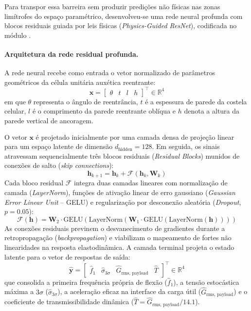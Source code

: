 Para transpor essa barreira sem produzir predições não físicas nas zonas limítrofes do espaço paramétrico, desenvolveu-se uma rede neural profunda com blocos residuais guiada por leis físicas (\textit{Physics-Guided ResNet}), codificada no módulo .

\paragraph*{Arquitetura da rede residual profunda.}
\label{par:arquitetura}
A rede neural recebe como entrada o vetor normalizado de parâmetros geométricos da célula unitária auxética reentrante:
\begin{equation}
  \mathbf{x} = \begin{bmatrix} \theta & t & l & h \end{bmatrix}^{\top} \in \mathbb{R}^{4}
  \label{eq:entrada}
\end{equation}
em que $\theta$ representa o ângulo de reentrância, $t$ é a espessura de parede da costela celular, $l$ é o comprimento da parede reentrante oblíqua e $h$ denota a altura da parede vertical de ancoragem.

O vetor $\mathbf{x}$ é projetado inicialmente por uma camada densa de projeção linear para um espaço latente de dimensão $d_{\text{hidden}} = 128$. Em seguida, os sinais atravessam sequencialmente três blocos residuais (\textit{Residual Blocks}) munidos de conexões de salto (\textit{skip connections}):
\begin{equation}
  \mathbf{h}_{k+1} = \mathbf{h}_k + \mathcal{F}(\mathbf{h}_k, \mathbf{W}_k)
  \label{eq:residual}
\end{equation}
Cada bloco residual $\mathcal{F}$ integra duas camadas lineares com normalização de camada (\textit{LayerNorm}), funções de ativação linear de erro gaussiano (\textit{Gaussian Error Linear Unit} -- GELU) e regularização por desconexão aleatória (\textit{Dropout}, $p = \num{0.05}$):
\begin{equation}
  \mathcal{F}(\mathbf{h}) = \mathbf{W}_2 \cdot \mathrm{GELU}\!\left( \mathrm{LayerNorm}\!\left( \mathbf{W}_1 \cdot \mathrm{GELU}\!\left( \mathrm{LayerNorm}(\mathbf{h}) \right) \right) \right)
  \label{eq:bloco}
\end{equation}
As conexões residuais previnem o desvanecimento de gradientes durante a retropropagação (\textit{backpropagation}) e viabilizam o mapeamento de fortes não linearidades na resposta elastodinâmica. A camada terminal projeta o estado latente para o vetor de respostas de saída:
\begin{equation}
  \hat{\mathbf{y}} = \begin{bmatrix} \hat{f}_1 & \hat{\sigma}_{3\sigma} & \hat{G}_{\text{rms, payload}} & \hat{T} \end{bmatrix}^{\top} \in \mathbb{R}^{4}
  \label{eq:saida}
\end{equation}
que consolida a primeira frequência própria de flexão ($\hat{f}_1$), a tensão estocástica máxima a $3\sigma$ ($\hat{\sigma}_{3\sigma}$), a aceleração eficaz na interface da carga útil ($\hat{G}_{\text{rms, payload}}$) e o coeficiente de transmissibilidade dinâmica ($\hat{T} = \hat{G}_{\text{rms, payload}} / \num{14.1}$).

